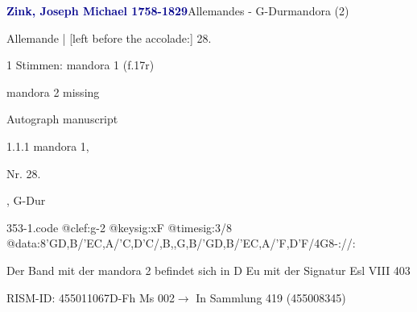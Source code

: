 \documentclass[twocolumn, 12pt]{book}
\begin{document}
\par \vspace{16pt} \textcolor{darkblue}{\textbf{Zink, Joseph Michael  1758-1829}}\hfillplus{\textbf{[353]}}\newline Allemandes - G-Dur\newline mandora (2)
\par \begin{itshape}[f.17r, at left:] Allemande | [left before the accolade:] 28.\end{itshape} 
\par \textcolor{darkblue}{}  1 Stimmen: mandora 1  (f.17r)\newline \begin{small} mandora 2 missing\end{small} \newline Autograph manuscript
\par 1.1.1  mandora 1, \begin{itshape}Nr. 28.\end{itshape}, G-Dur  
\begin{filecontents*}{353-1.code}
@clef:g-2
@keysig:xF
@timesig:3/8
@data:8'GD,B/'EC,A/'C,D'C/,B,,G,B/'GD,B/'EC,A/'F,D'F/4G8-://:
\end{filecontents*}
\newline %
\par Der Band mit der mandora 2 befindet sich in D Eu mit der Signatur Esl VIII 403
\par RISM-ID: 455011067\newline D-Fh  Ms 002\newline $\rightarrow$ In Sammlung 419 (455008345)
      
\end{document}
